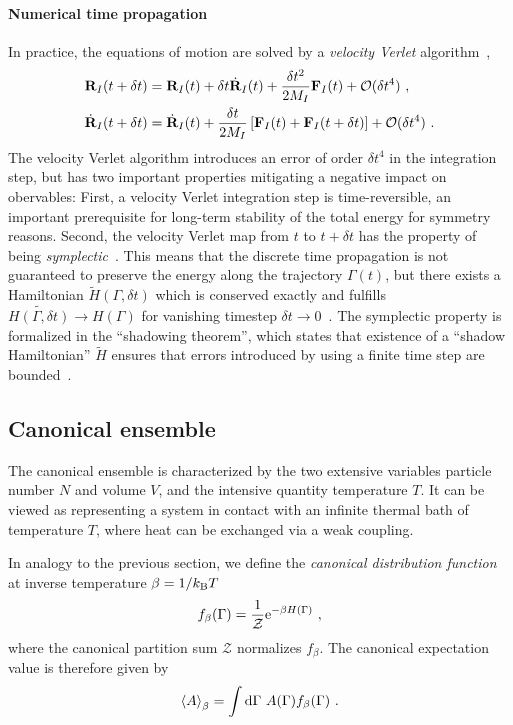 \paragraph{Numerical time propagation}
In practice, the equations of motion are solved by a \emph{velocity Verlet} algorithm~,
\begin{subequations}
\begin{align}
	{\bf R}_I (t + \delta t) 
		&= {\bf R}_I (t) + \delta t \dot{{\bf R}}_I (t) + \frac{\delta t^2}{2 M_I} {\bf F}_I(t) + \mathcal{O} (\delta t^4)~, \\
	\dot{{\bf R}}_I (t + \delta t) 
		&= \dot{{\bf R}}_I (t) + \frac{\delta t}{2 M_I} \left[{\bf F}_I(t) + {\bf F}_I (t + \delta t)\right] + \mathcal{O} (\delta t^4)~.
\end{align}
\label{eq:VelocityVerlet}
\end{subequations}
The velocity Verlet algorithm introduces an error of order $\delta t^4$ in the integration step, but has two important properties mitigating a negative impact on obervables: First, a velocity Verlet integration step is time-reversible, an important prerequisite for long-term stability of the total energy for symmetry reasons. Second, the velocity Verlet map from $t$ to $t + \delta t$ has the property of being \emph{symplectic}~\cite[p.\,101]{Tuckerman}. This means that the discrete time propagation is not guaranteed to preserve the energy along the trajectory $\Gamma(t)$, but there exists a Hamiltonian $\tilde{H} (\Gamma, \delta t)$ which is conserved exactly and fulfills $\tilde{H (\Gamma, \delta t)} \to H(\Gamma)$ for vanishing timestep $\delta t \to 0$~\cite[p.\,121]{Tuckerman}. The symplectic property is formalized in the ``shadowing theorem'', which states that existence of a ``shadow Hamiltonian'' $\tilde H$ ensures that errors introduced by using a finite time step are bounded~.

\subsection{Canonical ensemble}
The canonical ensemble is characterized by the two extensive variables particle number $N$ and volume $V$, and the intensive quantity temperature $T$. It can be viewed as representing a system in contact with an infinite thermal bath of temperature $T$, where heat can be exchanged via a weak coupling.

In analogy to the previous section, we define the \emph{canonical distribution function} at inverse temperature $\beta = 1 / k_{\rm B} T$
\begin{align}
	f_\beta (\Gamma) 
		= \frac{1}{\mathcal{Z}} {\rm e}^{- \beta H (\Gamma)}~,
	\label{eq:f.canonical}
\end{align}
where the  canonical partition sum $\mathcal{Z}$ normalizes $f_\beta$. The canonical expectation value is therefore given by
\begin{align}
	\braket{A}_\beta = \int {\rm d} \Gamma ~ A(\Gamma) f_\beta(\Gamma)~.
\end{align}

